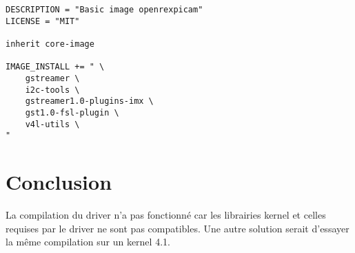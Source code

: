 \begin{lstlisting}
DESCRIPTION = "Basic image openrexpicam"
LICENSE = "MIT"

inherit core-image

IMAGE_INSTALL += " \
    gstreamer \
    i2c-tools \
    gstreamer1.0-plugins-imx \
    gst1.0-fsl-plugin \
    v4l-utils \
"
\end{lstlisting}


\section{Conclusion}

La compilation du driver n’a pas fonctionné car les librairies kernel et celles
requises par le driver ne sont pas compatibles. Une autre solution serait d’essayer
la même compilation sur un kernel 4.1.

